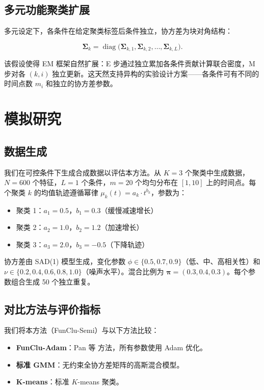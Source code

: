 \documentclass[12pt,a4paper]{article}
\DeclareMathOperator{\diag}{diag}
\begin{document}
\subsection{多元功能聚类扩展}

多元设定下，各条件在给定聚类标签后条件独立，协方差为块对角结构：

\begin{equation}\label{eq:block_diag}
    \bm{\Sigma}_k = \diag\bigl(\bm{\Sigma}_{k,1}, \bm{\Sigma}_{k,2}, \dots, \bm{\Sigma}_{k,L}\bigr).
\end{equation}

该假设使得 EM 框架自然扩展：E 步通过独立累加各条件贡献计算联合密度，M 步对各 $(k,i)$ 独立更新。这天然支持异构的实验设计方案——各条件可有不同的时间点数 $m_i$ 和独立的协方差参数。

\section{模拟研究}

\subsection{数据生成}

我们在可控条件下生成合成数据以评估本方法。从 $K=3$ 个聚类中生成数据，$N=600$ 个特征，$L=1$ 个条件，$m=20$ 个均匀分布在 $[1,10]$ 上的时间点。每个聚类 $k$ 的均值轨迹遵循幂律 $\mu_k(t) = a_k \cdot t^{b_k}$，参数为：
\begin{itemize}[leftmargin=*]
    \item 聚类 1：$a_1 = 0.5$，$b_1 = 0.3$（缓慢减速增长）
    \item 聚类 2：$a_2 = 1.0$，$b_2 = 1.2$（加速增长）
    \item 聚类 3：$a_3 = 2.0$，$b_3 = -0.5$（下降轨迹）
\end{itemize}
协方差由 SAD(1) 模型生成，变化参数 $\phi \in \{0.5, 0.7, 0.9\}$（低、中、高相关性）和 $\nu \in \{0.2, 0.4, 0.6, 0.8, 1.0\}$（噪声水平）。混合比例为 $\bm{\pi} = (0.3, 0.4, 0.3)$。每个参数组合生成 50 个独立重复。

\subsection{对比方法与评价指标}

我们将本方法（FunClu-Semi）与以下方法比较：
\begin{itemize}[leftmargin=*]
    \item \textbf{FunClu-Adam}：Pan 等 \cite{pan2026improved} 方法，所有参数使用 Adam 优化。
    \item \textbf{标准 GMM}：无约束全协方差矩阵的高斯混合模型。
    \item \textbf{K-means}：标准 $K$-means 聚类。
\end{itemize}
\end{document}
